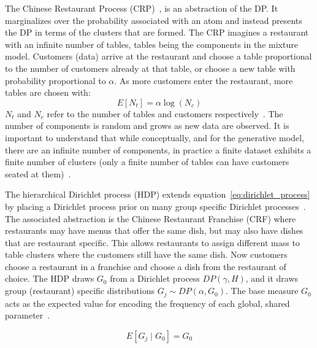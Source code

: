 The Chinese Restaurant Process (CRP)~\citep{neal2000markov, gershman2012tutorial}, is an abstraction of the DP. It marginalizes over the probability associated with an atom and instead presents the DP in terms of the clusters that are formed. The CRP imagines a restaurant with an infinite number of tables, tables being the components in the mixture model. Customers (data) arrive at the restaurant and choose a table proportional to the number of customers already at that table, or choose a new table with probability proportional to $\alpha$. As more customers enter the restaurant, more tables are chosen with:
\begin{equation}
  E[N_t] = \alpha \log(N_c)
\end{equation}
$N_t$ and $N_c$ refer to the number of tables and customers respectively~\citep{gershman2012tutorial}. The number of components is random and grows as new data are observed. It is important to understand that while conceptually, and for the generative model, there are an infinite number of components, in practice a finite dataset exhibits a finite number of clusters (only a finite number of tables can have customers seated at them)~\citep{blei2006variational}.

The hierarchical Dirichlet process (HDP) extends equation~\ref{eq:dirichlet_process} by placing a Dirichlet process prior on many group specific Dirichlet processes~\citep{teh2005sharing}. The associated abstraction is the Chinese Restaurant Franchise (CRF) where restaurants may have menus that offer the same dish, but may also have dishes that are restaurant specific. This allows restaurants to assign different mass to table clusters where the customers still have the same dish. Now customers choose a restaurant in a franchise and choose a dish from the restaurant of choice. The HDP draws $G_0$ from a Dirichlet process $DP(\gamma, H)$, and it draws group (restaurant) specific distributions $G_j \sim DP(\alpha, G_0)$. The base measure $G_0$ acts as the expected value for encoding the frequency of each global, shared parameter~\citep{fox2007hierarchical}.

\begin{equation}
  E[G_j \mid G_0] = G_0
\end{equation}

